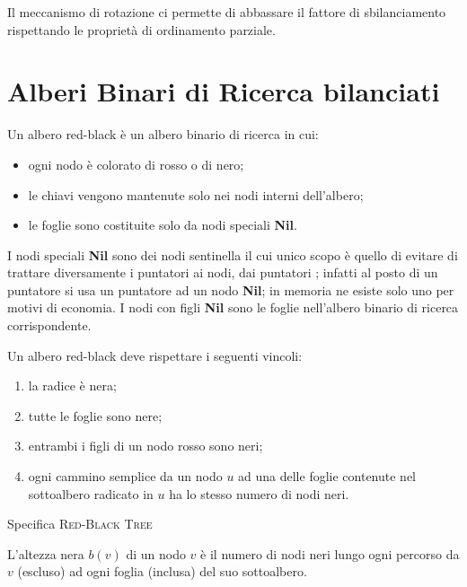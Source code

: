 \begin{note}
Il meccanismo di rotazione ci permette di abbassare il fattore di sbilanciamento rispettando le proprietà di ordinamento parziale.
\end{note}

\clearpage
\section{Alberi Binari di Ricerca bilanciati}

\begin{definition}
Un albero red-black è un albero binario di ricerca in cui:
\begin{itemize}
	\item ogni nodo è colorato di rosso o di nero;
	\item le chiavi vengono mantenute solo nei nodi interni dell'albero;
	\item le foglie sono costituite solo da nodi speciali \textbf{Nil}.
\end{itemize}
\end{definition}

I nodi speciali \textbf{Nil} sono dei nodi sentinella il cui unico scopo è quello di evitare di trattare diversamente i puntatori ai nodi, dai puntatori \Nil;
infatti al posto di un puntatore \Nil si usa un puntatore ad un nodo \textbf{Nil};
in memoria ne esiste solo uno per motivi di economia.
I nodi con figli \textbf{Nil} sono le foglie nell'albero binario di ricerca corrispondente.

Un albero red-black deve rispettare i seguenti vincoli:
\begin{enumerate}
	\item la radice è nera;
	\item tutte le foglie sono nere;
	\item entrambi i figli di un nodo rosso sono neri;
	\item ogni cammino semplice da un nodo \(u\) ad una delle foglie contenute nel sottoalbero radicato in \(u\) ha lo stesso numero di nodi neri.
\end{enumerate}

\begin{algorithm}[H]
	\caption{Specifica \textsc{Red-Black Tree}}
	
\end{algorithm}

\begin{property*}
L'altezza nera \(b(v)\) di un nodo \(v\) è il numero di nodi neri lungo ogni percorso da \(v\) (escluso) ad ogni foglia (inclusa) del suo sottoalbero.
\end{property*}

